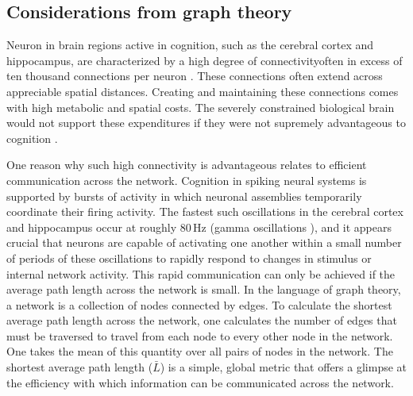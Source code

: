 \documentclass[twocolumn]{article}
\begin{document}
\subsection{Considerations from graph theory}
Neuron in brain regions active in cognition, such as the cerebral cortex and hippocampus, are characterized by a high degree of connectivity\textemdash often in excess of ten thousand connections per neuron \cite{brsc1998,bu2006}. These connections often extend across appreciable spatial distances. Creating and maintaining these connections comes with high metabolic and spatial costs. The severely constrained biological brain would not support these expenditures if they were not supremely advantageous to cognition \cite{busp2012}.

One reason why such high connectivity is advantageous relates to efficient communication across the network. Cognition in spiking neural systems is supported by bursts of activity in which neuronal assemblies temporarily coordinate their firing activity. The fastest such oscillations in the cerebral cortex and hippocampus occur at roughly 80\,Hz (gamma oscillations \cite{bu2006}), and it appears crucial that neurons are capable of activating one another within a small number of periods of these oscillations to rapidly respond to changes in stimulus or internal network activity. This rapid communication can only be achieved if the average path length across the network is small. In the language of graph theory, a network is a collection of nodes connected by edges. To calculate the shortest average path length across the network, one calculates the number of edges that must be traversed to travel from each node to every other node in the network. One takes the mean of this quantity over all pairs of nodes in the network. The shortest average path length ($\bar{L}$) is a simple, global metric that offers a glimpse at the efficiency with which information can be communicated across the network.
\end{document}
